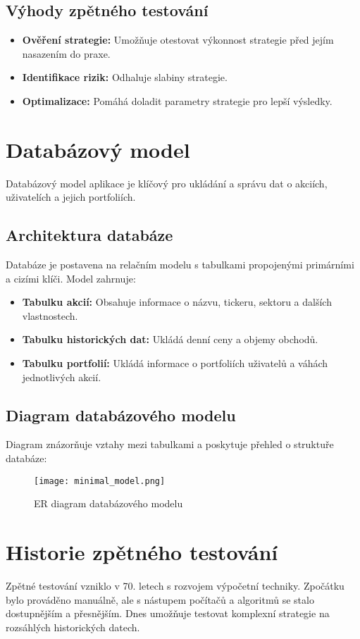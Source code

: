 \documentclass[12pt, a4paper]{report}
\begin{document}
\subsection{Výhody zpětného testování}
\begin{itemize}
    \item \textbf{Ověření strategie:} Umožňuje otestovat výkonnost strategie před jejím nasazením do praxe.
    \item \textbf{Identifikace rizik:} Odhaluje slabiny strategie.
    \item \textbf{Optimalizace:} Pomáhá doladit parametry strategie pro lepší výsledky.
\end{itemize}

\section{Databázový model}
Databázový model aplikace je klíčový pro ukládání a správu dat o akciích, uživatelích a jejich portfoliích.

\subsection{Architektura databáze}
Databáze je postavena na relačním modelu s tabulkami propojenými primárními a cizími klíči. Model zahrnuje:
\begin{itemize}
    \item \textbf{Tabulku akcií:} Obsahuje informace o názvu, tickeru, sektoru a dalších vlastnostech.
    \item \textbf{Tabulku historických dat:} Ukládá denní ceny a objemy obchodů.
    \item \textbf{Tabulku portfolií:} Ukládá informace o portfoliích uživatelů a váhách jednotlivých akcií.
\end{itemize}

\subsection{Diagram databázového modelu}
Diagram znázorňuje vztahy mezi tabulkami a poskytuje přehled o struktuře databáze:
\begin{figure}[h]
    \centering
    \texttt{[image: minimal\_model.png]}
    \caption{ER diagram databázového modelu}
\end{figure}

\section{Historie zpětného testování}
Zpětné testování vzniklo v 70. letech s rozvojem výpočetní techniky. Zpočátku bylo prováděno manuálně, ale s nástupem počítačů a algoritmů se stalo dostupnějším a přesnějším. Dnes umožňuje testovat komplexní strategie na rozsáhlých historických datech.
\end{document}
